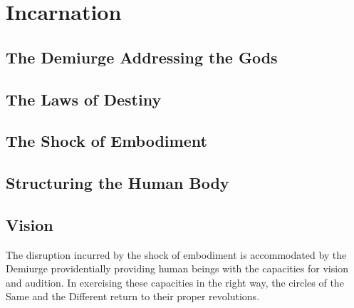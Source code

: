\chapter{Incarnation} %
\label{cha:incarnation}

\section{The Demiurge Addressing the Gods} %
\label{sec:the_demiurge_addressing_the_gods}




\section{The Laws of Destiny} %
\label{sec:the_laws_of_destiny}




\section{The Shock of Embodiment} %
\label{sec:the_shock_of_embodiment}




\section{Structuring the Human Body} %
\label{sec:structuring_the_human_body}




\section{Vision} %
\label{sec:vision}

The disruption incurred by the shock of embodiment is accommodated by the Demiurge providentially providing human beings with the capacities for vision and audition. In exercising these capacities in the right way, the circles of the Same and the Different return to their proper revolutions. 

